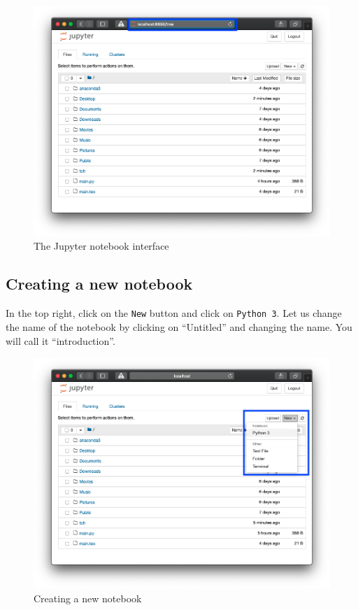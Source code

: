 \begin{figure}[htbp]
\centering
    \includegraphics[width=0.750\linewidth]{assets/the_jupyter_interface/main.png}
    \caption{The Jupyter notebook interface}
\end{figure}

\subsection{Creating a new notebook}
In the top right, click on the \texttt{New} button and click on \texttt{Python 3}.
Let us change the name of the notebook by clicking on “Untitled” and changing
the name. You will call it “introduction”.

\begin{figure}[htbp]
\centering
    \includegraphics[width=0.750\linewidth]{assets/creating_a_new_notebook/main.png}
    \caption{Creating a new notebook}
\end{figure}

